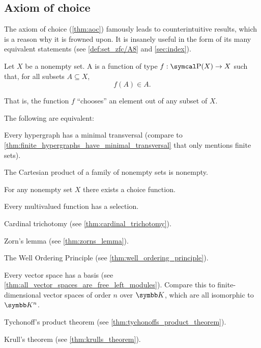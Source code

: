 \subsection{Axiom of choice}\label{subsec:axiom_of_choice}

\begin{remark}\label{remark:aoc}
  The axiom of choice (\cref{thm:aoc}) famously leads to counterintuitive results, which is a reason why it is frowned upon. It is insanely useful in the form of its many equivalent statements (see \cref{def:set_zfc/A8} and \cref{sec:index}).
\end{remark}

\begin{definition}\label{def:choice_function}
  Let \( X \) be a nonempty set. A  is a function of type \( f: \Power(X) \to X \) such that, for all subsets \( A \subseteq X \),
  \begin{equation*}
    f(A) \in A.
  \end{equation*}

  That is, the function \( f \) \enquote{chooses} an element out of any subset of \( X \).
\end{definition}

\begin{theorem}\label{thm:aoc}
  The following are equivalent:

  \begin{thmenum}
    \cite[theorem 6M(4)]{Enderton1977} Every hypergraph has a minimal transversal (compare to \cref{thm:finite_hypergraphs_have_minimal_transversal} that only mentions finite sets).

    \cite[theorem 6M(2)]{Enderton1977} The Cartesian product of a family of nonempty sets is nonempty.

    \cite[theorem 6M(3)]{Enderton1977} For any nonempty set \( X \) there exists a choice function.

    \cite[theorem 6M(1)]{Enderton1977} Every multivalued function has a selection.

     Cardinal trichotomy (see \cref{thm:cardinal_trichotomy}).

     Zorn's lemma (see \cref{thm:zorns_lemma}).

     The Well Ordering Principle (see \cref{thm:well_ordering_principle}).

     Every vector space has a basis (see \cref{thm:all_vector_spaces_are_free_left_modules}). Compare this to finite-dimensional vector spaces of order \( n \) over \( \BK \), which are all isomorphic to \( \BK^n \).

     Tychonoff's product theorem (see \cref{thm:tychonoffs_product_theorem}).

     Krull's theorem (see \cref{thm:krulls_theorem}).
  \end{thmenum}
\end{theorem}
